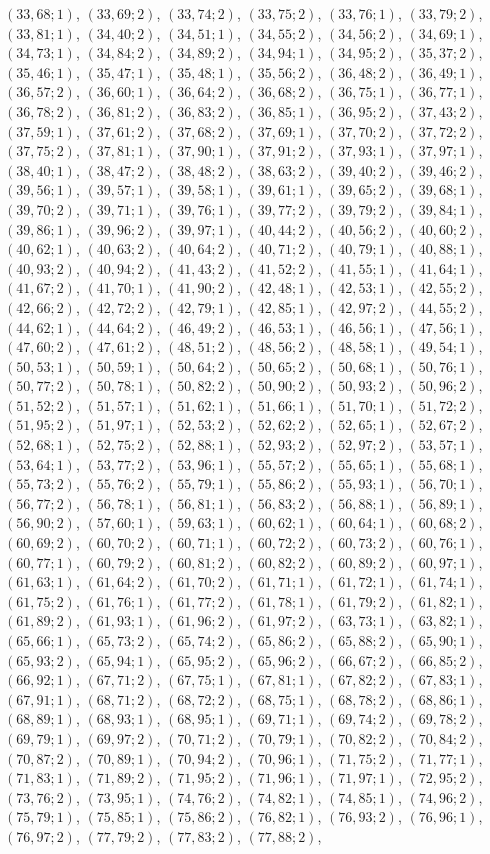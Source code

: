 \documentclass[11pt]{article}
\begin{document}
$(33,68;1)$, $(33,69;2)$, $(33,74;2)$, $(33,75;2)$, $(33,76;1)$, $(33,79;2)$, $(33,81;1)$, $(34,40;2)$, $(34,51;1)$, $(34,55;2)$, $(34,56;2)$, $(34,69;1)$, $(34,73;1)$, $(34,84;2)$, $(34,89;2)$, $(34,94;1)$, $(34,95;2)$, $(35,37;2)$, $(35,46;1)$, $(35,47;1)$, $(35,48;1)$, $(35,56;2)$, $(36,48;2)$, $(36,49;1)$, $(36,57;2)$, $(36,60;1)$, $(36,64;2)$, $(36,68;2)$, $(36,75;1)$, $(36,77;1)$, $(36,78;2)$, $(36,81;2)$, $(36,83;2)$, $(36,85;1)$, $(36,95;2)$, $(37,43;2)$, $(37,59;1)$, $(37,61;2)$, $(37,68;2)$, $(37,69;1)$, $(37,70;2)$, $(37,72;2)$, $(37,75;2)$, $(37,81;1)$, $(37,90;1)$, $(37,91;2)$, $(37,93;1)$, $(37,97;1)$, $(38,40;1)$, $(38,47;2)$, $(38,48;2)$, $(38,63;2)$, $(39,40;2)$, $(39,46;2)$, $(39,56;1)$, $(39,57;1)$, $(39,58;1)$, $(39,61;1)$, $(39,65;2)$, $(39,68;1)$, $(39,70;2)$, $(39,71;1)$, $(39,76;1)$, $(39,77;2)$, $(39,79;2)$, $(39,84;1)$, $(39,86;1)$, $(39,96;2)$, $(39,97;1)$, $(40,44;2)$, $(40,56;2)$, $(40,60;2)$, $(40,62;1)$, $(40,63;2)$, $(40,64;2)$, $(40,71;2)$, $(40,79;1)$, $(40,88;1)$, $(40,93;2)$, $(40,94;2)$, $(41,43;2)$, $(41,52;2)$, $(41,55;1)$, $(41,64;1)$, $(41,67;2)$, $(41,70;1)$, $(41,90;2)$, $(42,48;1)$, $(42,53;1)$, $(42,55;2)$, $(42,66;2)$, $(42,72;2)$, $(42,79;1)$, $(42,85;1)$, $(42,97;2)$, $(44,55;2)$, $(44,62;1)$, $(44,64;2)$, $(46,49;2)$, $(46,53;1)$, $(46,56;1)$, $(47,56;1)$, $(47,60;2)$, $(47,61;2)$, $(48,51;2)$, $(48,56;2)$, $(48,58;1)$, $(49,54;1)$, $(50,53;1)$, $(50,59;1)$, $(50,64;2)$, $(50,65;2)$, $(50,68;1)$, $(50,76;1)$, $(50,77;2)$, $(50,78;1)$, $(50,82;2)$, $(50,90;2)$, $(50,93;2)$, $(50,96;2)$, $(51,52;2)$, $(51,57;1)$, $(51,62;1)$, $(51,66;1)$, $(51,70;1)$, $(51,72;2)$, $(51,95;2)$, $(51,97;1)$, $(52,53;2)$, $(52,62;2)$, $(52,65;1)$, $(52,67;2)$, $(52,68;1)$, $(52,75;2)$, $(52,88;1)$, $(52,93;2)$, $(52,97;2)$, $(53,57;1)$, $(53,64;1)$, $(53,77;2)$, $(53,96;1)$, $(55,57;2)$, $(55,65;1)$, $(55,68;1)$, $(55,73;2)$, $(55,76;2)$, $(55,79;1)$, $(55,86;2)$, $(55,93;1)$, $(56,70;1)$, $(56,77;2)$, $(56,78;1)$, $(56,81;1)$, $(56,83;2)$, $(56,88;1)$, $(56,89;1)$, $(56,90;2)$, $(57,60;1)$, $(59,63;1)$, $(60,62;1)$, $(60,64;1)$, $(60,68;2)$, $(60,69;2)$, $(60,70;2)$, $(60,71;1)$, $(60,72;2)$, $(60,73;2)$, $(60,76;1)$, $(60,77;1)$, $(60,79;2)$, $(60,81;2)$, $(60,82;2)$, $(60,89;2)$, $(60,97;1)$, $(61,63;1)$, $(61,64;2)$, $(61,70;2)$, $(61,71;1)$, $(61,72;1)$, $(61,74;1)$, $(61,75;2)$, $(61,76;1)$, $(61,77;2)$, $(61,78;1)$, $(61,79;2)$, $(61,82;1)$, $(61,89;2)$, $(61,93;1)$, $(61,96;2)$, $(61,97;2)$, $(63,73;1)$, $(63,82;1)$, $(65,66;1)$, $(65,73;2)$, $(65,74;2)$, $(65,86;2)$, $(65,88;2)$, $(65,90;1)$, $(65,93;2)$, $(65,94;1)$, $(65,95;2)$, $(65,96;2)$, $(66,67;2)$, $(66,85;2)$, $(66,92;1)$, $(67,71;2)$, $(67,75;1)$, $(67,81;1)$, $(67,82;2)$, $(67,83;1)$, $(67,91;1)$, $(68,71;2)$, $(68,72;2)$, $(68,75;1)$, $(68,78;2)$, $(68,86;1)$, $(68,89;1)$, $(68,93;1)$, $(68,95;1)$, $(69,71;1)$, $(69,74;2)$, $(69,78;2)$, $(69,79;1)$, $(69,97;2)$, $(70,71;2)$, $(70,79;1)$, $(70,82;2)$, $(70,84;2)$, $(70,87;2)$, $(70,89;1)$, $(70,94;2)$, $(70,96;1)$, $(71,75;2)$, $(71,77;1)$, $(71,83;1)$, $(71,89;2)$, $(71,95;2)$, $(71,96;1)$, $(71,97;1)$, $(72,95;2)$, $(73,76;2)$, $(73,95;1)$, $(74,76;2)$, $(74,82;1)$, $(74,85;1)$, $(74,96;2)$, $(75,79;1)$, $(75,85;1)$, $(75,86;2)$, $(76,82;1)$, $(76,93;2)$, $(76,96;1)$, $(76,97;2)$, $(77,79;2)$, $(77,83;2)$, $(77,88;2)$, 
\end{document}
